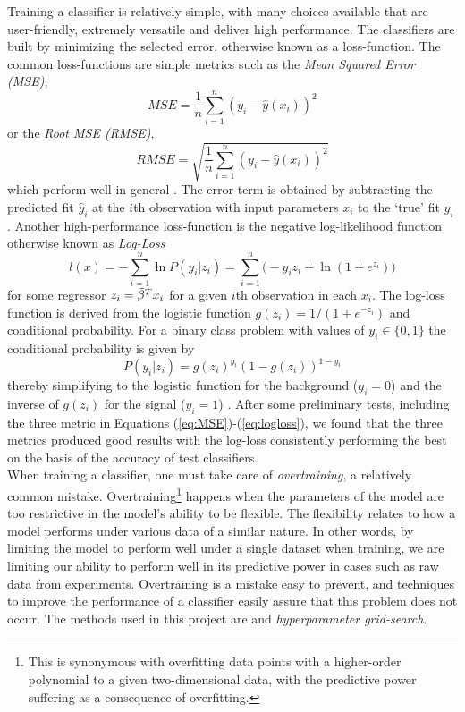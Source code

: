 Training a classifier is relatively simple, with many choices available that are user-friendly, extremely versatile and deliver high performance. The classifiers are built by minimizing the selected error, otherwise known as a loss-function. The common loss-functions are simple metrics such as the \textit{Mean Squared Error (MSE)}, 
\begin{equation}
    MSE = \frac{1}{n} \sum\limits_{i=1}^{n}(y_i-\hat{y}(x_i))^2
    \label{eq:MSE}
\end{equation}
or the \textit{Root MSE (RMSE)},
\begin{equation}
    RMSE = \sqrt{\frac{1}{n}\sum\limits_{i=1}^{n}(y_i-\hat{y}(x_i))^2}
    \label{eq:RMSE}
\end{equation}
which perform well in general \cite{james2013introduction}. The error term is obtained by subtracting the predicted fit $\hat{y}_i$ at the $i$th observation with input parameters $x_i$ to the `true' fit $y_i$ \cite{james2013introduction}. Another high-performance loss-function is the negative log-likelihood function otherwise known as \textit{Log-Loss}
\begin{equation}
    l(x) = -\sum\limits_{i=1}^{n} \ln P(y_i| z_i) = \sum\limits_{i=1}^{n} \Big(-y_i z_i + \ln(1+e^{z_i}) \Big)
    \label{eq:logloss}
\end{equation}
for some regressor $z_i=\Tilde{\beta}^T x_i$ for a given $i$th observation in each $x_i$. The log-loss function is derived from the logistic function $g(z_i)=1/(1+e^{-z_i})$ and conditional probability. For a binary class problem with values of $y_i\in\{0,1\}$ the conditional probability is given by
\begin{equation}
    P(y_i| z_i) = g(z_i)^{y_i}(1-g(z_i))^{1-y_i}
\end{equation}
thereby simplifying to the logistic function for the background ($y_i=0$) and the inverse of $g(z_i)$ for the signal ($y_i=1$) \cite{knetml}. After some preliminary tests, including the three metric in Equations (\ref{eq:MSE})-(\ref{eq:logloss}), we found that the three metrics produced good results with the log-loss consistently performing the best on the basis of the accuracy of test classifiers. \\

When training a classifier, one must take care of \textit{overtraining}, a relatively common mistake. Overtraining\footnote{This is synonymous with overfitting data points with a higher-order polynomial to a given two-dimensional data, with the predictive power suffering as a consequence of overfitting.} happens when the parameters of the model are too restrictive in the model's ability to be flexible. The flexibility relates to how a model performs under various data of a similar nature. In other words, by limiting the model to perform well under a single dataset when training, we are limiting our ability to perform well in its predictive power in cases such as raw data from experiments. Overtraining is a mistake easy to prevent, and techniques to improve the performance of a classifier easily assure that this problem does not occur. The methods used in this project are  and \textit{hyperparameter grid-search}. \\

